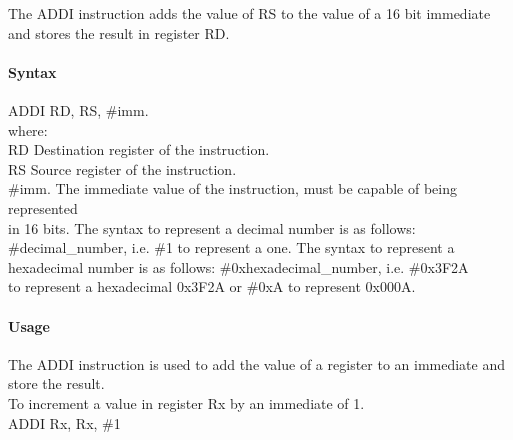 \documentclass[12pt]{article}
\begin{document}
    \noindent
    The ADDI instruction adds the value of RS to the value of a 16 bit immediate and stores the result in register RD. 
    
    \paragraph{Syntax}
    \begin{flushleft}
    ADDI RD, RS, \#imm.\\
    \vspace{1em}        %
    where:\\
    \vspace{1em}
    RD  \hspace{3.6em} Destination register of the instruction.\\
    \vspace{1em}
    RS  \hspace{3.85em} Source register of the instruction.\\
    \vspace{1em}
    \#imm.  \hspace{1.8em} The immediate value of the instruction, must be capable of being represented\\             \hspace{5.4em} in 16 bits. The syntax to represent a decimal number is as follows:\\
            \hspace{5.4em} \#decimal\_number, i.e. \#1 to represent a one. The syntax to represent a\\
            \hspace{5.4em} hexadecimal number is as follows: \#0xhexadecimal\_number, i.e. \#0x3F2A \\
            \hspace{5.4em} to represent a hexadecimal 0x3F2A or \#0xA to represent 0x000A.\\
    \end{flushleft}
    
    \paragraph{Usage}
    \begin{flushleft}
    The ADDI instruction is used to add the value of a register to an immediate and store the result.\\
    \vspace{1em}
    To increment a value in register Rx by an immediate of 1.\\
    \vspace{1em}
    ADDI Rx, Rx, \#1
    \end{flushleft}
    
\end{document}
